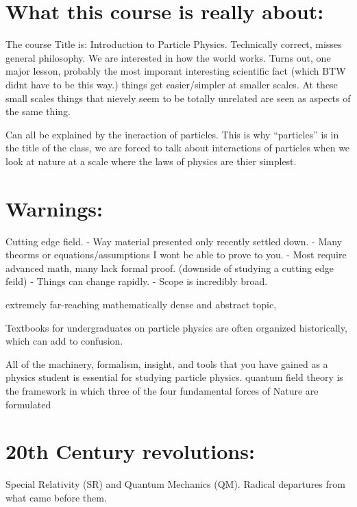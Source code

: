 
\usepackage{braket}

\def\ketY{\ensuremath{\ket {\Psi}}}
\def\iGeV{\ensuremath{\textrm{GeV}^{-1}}}


\section{What this course is really about:}
The course Title is: Introduction to Particle Physics.
Technically correct, misses general philosophy. 
We are interested in how the world works. 
Turns out, one major lesson, probably the most imporant interesting scientific fact (which BTW didnt have to be this way.) things get easier/simpler at smaller scales. 
At these small scales things that nievely seem to be totally unrelated are seen as aspects of the same thing. 

Can all be explained by the ineraction of particles. 
This is why ``particles'' is in the title of the class, we are forced to talk about interactions of particles when we look at nature at a scale where the laws of physics are thier simplest. 

\section{Warnings:}
Cutting edge field. 
- Way material presented only recently settled down. 
- Many theorms or equations/assumptions I wont be able to prove to you. 
- Most require advanced math, many lack formal proof.  (downside of studying a cutting edge feild)
- Things can change rapidly. 
- Scope is incredibly broad. 

extremely far-reaching
mathematically dense and abstract topic,

Textbooks for undergraduates on particle physics are often organized historically, which can add to confusion. 

All of the machinery, formalism, insight, and tools that you have gained as a physics student is essential for studying particle physics.
quantum field theory is the framework in which three of the four fundamental forces of Nature are formulated

\section{20th Century revolutions:}
Special Relativity (SR) and Quantum Mechanics (QM).
Radical departures from what came before them.

